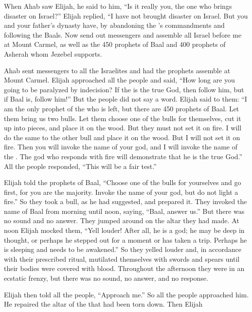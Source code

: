 {When
Ahab
saw
Elijah,
he
said
to him, “Is it really you,
the one who brings disaster
on Israel?”
Elijah replied,
“I have not
brought disaster
on Israel.
But
you
and your father’s
dynasty
have,
by abandoning
the
{}’s
commandments
and following
the Baals.
Now
send out
messengers and assemble
all
Israel
before
me at
Mount
Carmel,
as well as the 450
prophets
of Baal
and 400
prophets
of Asherah
whom Jezebel
supports.
\par }{\PP {}Ahab
sent
messengers to all
the Israelites
and had the prophets
assemble
at Mount
Carmel.
Elijah
approached
all
the people
and said,
“How long
are you
going to be paralyzed
by indecision? If
the {}
is the true God,
then
follow
him, but if
Baal
is, follow
him!” But
the people
did not
say a word.
Elijah
said
to them: “I am
the only
prophet
of the {}
who is left,
but there are 450
prophets
of Baal.
Let
them bring us two
bulls.
Let them
choose
one
of the bulls
for themselves, cut
it up into pieces, and place
it on
the wood.
But they must not
set
it on fire.
I
will do
the same
to the
other bull
and place
it on
the wood.
But I will not
set
it on fire.
Then
you will invoke
the name
of your god,
and I
will invoke
the name
of the {}. The god
who
responds
with fire
will demonstrate
that he is the true God.”
All
the people
responded,
“This
will be
a fair test.”
\par }{\PP {}Elijah
told
the prophets
of Baal,
“Choose
one
of the bulls
for yourselves and go first,
for
you
are the majority.
Invoke
the name
of your god,
but do not
light
a fire.”
So they took
a bull,
as
he had
suggested,
and prepared
it. They invoked
the name
of Baal
from morning
until
noon,
saying,
“Baal,
answer
us.” But there was no
sound
and no
answer.
They jumped
around on
the altar
they had
made.
At noon
Elijah
mocked
them, “Yell
louder! After all, he is a god;
he may be deep in thought,
or perhaps he stepped out
for
a moment or has taken a trip.
Perhaps
he is sleeping
and needs to be awakened.”
So
they yelled
louder
and, in accordance with their prescribed
ritual, mutilated
themselves with swords
and spears
until
their bodies
were covered with blood.
Throughout the afternoon
they were in an ecstatic
frenzy,
but there was no
sound,
no
answer,
and no
response.
\par }{\PP {}Elijah
then told all
the people,
“Approach
me.”
So
all
the people
approached
him.
He repaired
the altar
of the {}
that had been torn down.
Then
Elijah
}
